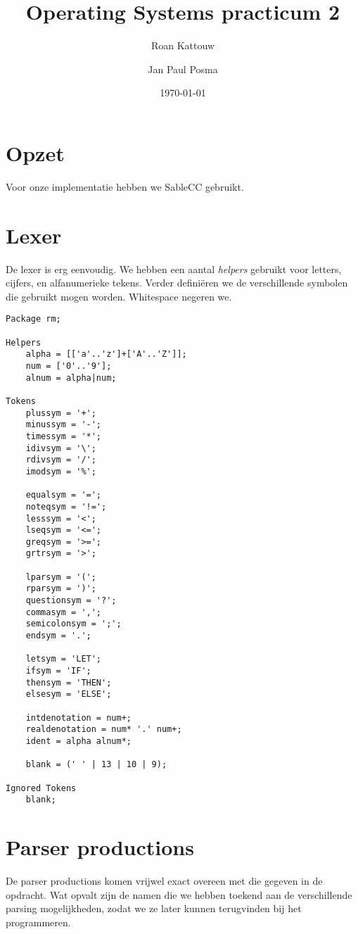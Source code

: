 \documentclass[11pt]{article}
\begin{document}
\author{Roan Kattouw \and Jan Paul Posma}
\date{\today}
\title{Operating Systems practicum 2}

\maketitle

\section{Opzet}
Voor onze implementatie hebben we SableCC gebruikt.

\section{Lexer}
De lexer is erg eenvoudig. We hebben een aantal \emph{helpers} gebruikt voor letters, cijfers, en alfanumerieke tekens. Verder defini\"eren we de verschillende symbolen die gebruikt mogen worden. Whitespace negeren we.

\begin{verbatim}
Package rm;

Helpers
	alpha = [['a'..'z']+['A'..'Z']];
	num = ['0'..'9'];
	alnum = alpha|num;

Tokens
	plussym = '+';
	minussym = '-';
	timessym = '*';
	idivsym = '\';
	rdivsym = '/';
	imodsym = '%';

	equalsym = '=';
	noteqsym = '!=';
	lesssym = '<';
	lseqsym = '<=';
	greqsym = '>=';
	grtrsym = '>';

	lparsym = '(';
	rparsym = ')';
	questionsym = '?';
	commasym = ',';
	semicolonsym = ';';
	endsym = '.';
	
	letsym = 'LET';
	ifsym = 'IF';
	thensym = 'THEN';
	elsesym = 'ELSE';

	intdenotation = num+;
	realdenotation = num* '.' num+;
	ident = alpha alnum*;

	blank = (' ' | 13 | 10 | 9);

Ignored Tokens
	blank;
\end{verbatim}

\section{Parser productions}

De parser productions komen vrijwel exact overeen met die gegeven in de opdracht. Wat opvalt zijn de namen die we hebben toekend aan de verschillende parsing mogelijkheden, zodat we ze later kunnen terugvinden bij het programmeren.
\end{document}
